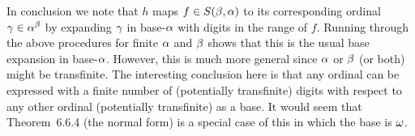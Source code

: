 {  In conclusion we note that $h$ maps $f \in S(\beta,\alpha)$ to its corresponding ordinal $\gamma \in \alpha^\beta$ by expanding $\gamma$ in base-$\alpha$ with digits in the range of $f$.
  Running through the above procedures for finite $\alpha$ and $\beta$ shows that this is the usual base expansion in base-$\alpha$.
  However, this is much more general since $\alpha$ or $\beta$ (or both) might be transfinite.
  The interesting conclusion here is that any ordinal can be expressed with a finite number of (potentially transfinite) digits with respect to any other ordinal (potentially transfinite) as a base.
  It would seem that Theorem~6.6.4 (the normal form) is a special case of this in which the base is $\omega$.
}
